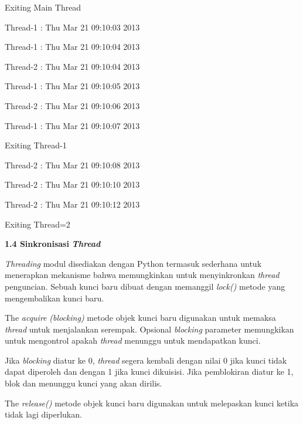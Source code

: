 \noindent 
{\fontsize{10pt}{10pt}\selectfont Exiting Main Thread} \par
\noindent 
{\fontsize{10pt}{10pt}\selectfont Thread-1 : Thu Mar 21 09:10:03 2013} \par
\noindent 
{\fontsize{10pt}{10pt}\selectfont Thread-1 : Thu Mar 21 09:10:04 2013} \par
\noindent 
{\fontsize{10pt}{10pt}\selectfont Thread-2 : Thu Mar 21 09:10:04 2013} \par
\noindent 
{\fontsize{10pt}{10pt}\selectfont Thread-1 : Thu Mar 21 09:10:05 2013} \par
\noindent 
{\fontsize{10pt}{10pt}\selectfont Thread-2 : Thu Mar 21 09:10:06 2013} \par
\noindent 
{\fontsize{10pt}{10pt}\selectfont Thread-1 : Thu Mar 21 09:10:07 2013} \par
\noindent 
{\fontsize{10pt}{10pt}\selectfont Exiting Thread-1} \par
\noindent 
{\fontsize{10pt}{10pt}\selectfont Thread-2 : Thu Mar 21 09:10:08 2013} \par
\noindent 
{\fontsize{10pt}{10pt}\selectfont Thread-2 : Thu Mar 21 09:10:10 2013} \par
\noindent 
{\fontsize{10pt}{10pt}\selectfont Thread-2 : Thu Mar 21 09:10:12 2013} \par
\noindent 
{\fontsize{10pt}{10pt}\selectfont Exiting Thread=2} \par
\vspace{10pt}
\textbf{ 1.4 Sinkronisasi }\textbf{\textit{Thread}} \par
\textit{T}\textit{hread}\textit{ing }modul disediakan dengan Python termasuk sederhana untuk menerapkan mekanisme bahwa memungkinkan untuk menyinkronkan \textit{thread}\textit{ }penguncian. Sebuah kunci baru dibuat dengan memanggil \textit{lock() }metode yang mengembalikan kunci baru. \par
The \textit{acquire}\textit{ }\textit{(blocking)}\textit{ }metode objek kunci baru digunakan untuk memaksa \textit{thread}\textit{ }untuk menjalankan serempak. Opsional \textit{blocking} parameter memungkikan untuk mengontrol apakah\textit{ thread} menunggu untuk mendapatkan kunci. \par
Jika \textit{blocking} diatur ke 0, \textit{thread} segera kembali dengan nilai 0 jika kunci tidak dapat diperoleh dan dengan 1 jika kunci dikuisisi. Jika pemblokiran diatur ke 1, blok dan menunggu kunci yang akan dirilis. \par
The \textit{release()} metode objek kunci baru digunakan untuk melepaskan kunci ketika tidak lagi diperlukan.  \par
